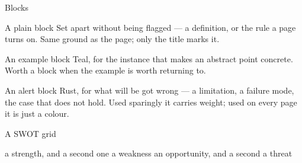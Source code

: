 \documentclass[aspectratio=169]{beamer}
\begin{document}
\begin{frame}{Blocks}

  \begin{block}{A plain block}
    Set apart without being flagged — a definition, or the rule a page turns
    on. Same ground as the page; only the title marks it.
  \end{block}

  \begin{exampleblock}{An example block}
    Teal, for the instance that makes an abstract point concrete. Worth a block
    when the example is worth returning to.
  \end{exampleblock}

  \begin{alertblock}{An alert block}
    Rust, for what will be got wrong — a limitation, a failure mode, the case
    that does not hold. Used sparingly it carries weight; used on every page it
    is just a colour.
  \end{alertblock}

\end{frame}

\begin{frame}{A SWOT grid}

  \vspace{-0.6em}
  \swot
    {\scriptsize a strength, and a second one}
    {\scriptsize a weakness}
    {\scriptsize an opportunity, and a second}
    {\scriptsize a threat}

\end{frame}
\end{document}
